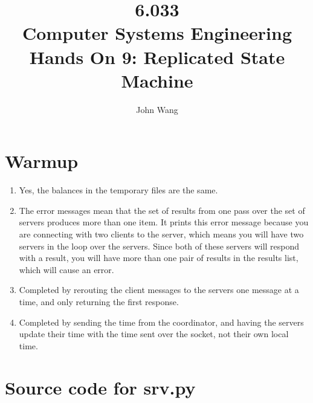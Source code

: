 \documentclass[psamsfonts]{amsart}
\title{6.033 \\
Computer Systems Engineering \\
Hands On 9: Replicated State Machine}
\author{John Wang}
\begin{document}
\maketitle

\section{Warmup}

\begin{enumerate}
  \item Yes, the balances in the temporary files are the same.
  \item The error messages mean that the set of results from one pass over the set of servers produces more than one item. It prints this error message because you are connecting with two clients to the server, which means you will have two servers in the loop over the servers. Since both of these servers will respond with a result, you will have more than one pair of results in the results list, which will cause an error.
  \item Completed by rerouting the client messages to the servers one message at a time, and only returning the first response.
  \item Completed by sending the time from the coordinator, and having the servers update their time with the time sent over the socket, not their own local time.
\end{enumerate}

\newpage

\section{Source code for srv.py}
\end{document}
